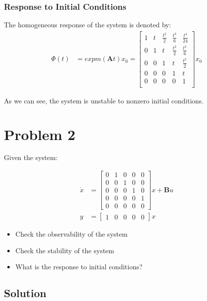\documentclass[]{article}
\begin{document}
\subsubsection{Response to Initial Conditions}
The homogeneous response of the system is denoted by:
\begin{align*}
	\Phi(t) &= expm(\mathbf{A}t)x_0 = \begin{bmatrix}
	1 & t & \frac{t^2}{2} & \frac{t^3}{6} & \frac{t^4}{24} \\
	0 & 1 & t & \frac{t^2}{2} & \frac{t^3}{6} \\
	0 & 0 & 1 & t & \frac{t^2}{2} \\
	0 & 0 & 0 & 1 & t \\
	0 & 0 & 0 & 0 & 1 \\
	\end{bmatrix}x_0
\end{align*}

As we can see, the system is unstable to nonzero initial conditions.
\section{Problem 2}

Given the system:

\begin{align*}
\dot{x} &= \begin{bmatrix}
0 & 1 & 0 & 0 & 0 \\
0 & 0 & 1 & 0 & 0 \\
0 & 0 & 0 & 1 & 0 \\
0 & 0 & 0 & 0 & 1 \\
0 & 0 & 0 & 0 & 0
\end{bmatrix}
x + \mathbf{B}u
\\
y &= \begin{bmatrix}
1 & 0 & 0 & 0 & 0
\end{bmatrix}x
\end{align*}

\begin{itemize}
	\item Check the observability of the system
	\item Check the stability of the system
	\item What is the response to initial conditions?
\end{itemize}

\subsection{Solution}
\end{document}
